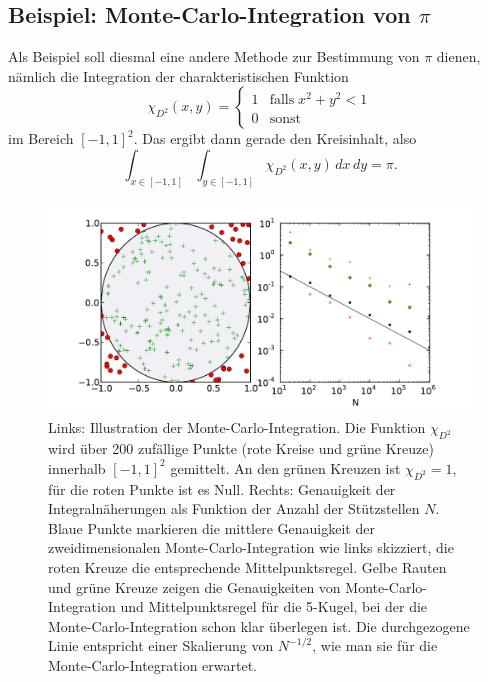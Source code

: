 \subsection{\texorpdfstring{Beispiel: Monte-Carlo-Integration von
    $\pi$}{Beispiel: Quasi-Monte-Carlo-Integration von pi}}

Als Beispiel soll diesmal eine andere Methode zur Bestimmung von
$\pi$ dienen, nämlich die Integration der charakteristischen Funktion
\begin{equation}
  \chi_{D^2}(x, y)=
  \begin{cases}
    1 & \text{falls}\; x^2 + y^2 < 1\\
    0 & \text{sonst}
  \end{cases}
\end{equation}
im Bereich $[-1,1]^2$. Das ergibt dann gerade den Kreisinhalt, also
\begin{equation}
  \int_{x\in[-1,1]}\int_{y\in[-1,1]}\chi_{D^2}(x, y)\,dx\,dy
  = \pi.
\end{equation}

\begin{figure}
  \centering
  \includegraphics[width=\textwidth]{plots/pi}
  \caption{Links: Illustration der Monte-Carlo-Integration. Die
    Funktion $\chi_{D^2}$ wird über 200 zufällige Punkte (rote Kreise
    und grüne Kreuze) innerhalb $[-1,1]^2$ gemittelt. An den grünen
    Kreuzen ist $\chi_{D^2}=1$, für die roten Punkte ist es
    Null. Rechts: Genauigkeit der Integralnäherungen als Funktion der
    Anzahl der Stützstellen $N$.  Blaue Punkte markieren die mittlere
    Genauigkeit der zweidimensionalen Monte-Carlo-Integration wie
    links skizziert, die roten Kreuze die entsprechende
    Mittelpunktsregel. Gelbe Rauten und grüne Kreuze zeigen die
    Genauigkeiten von Monte-Carlo-Integration und Mittelpunktsregel
    für die 5-Kugel, bei der die Monte-Carlo-Integration schon klar
    überlegen ist. Die durchgezogene Linie entspricht einer Skalierung
    von $N^{-1/2}$, wie man sie für die Monte-Carlo-Integration
    erwartet.}
  \label{fig:pi}
\end{figure}

